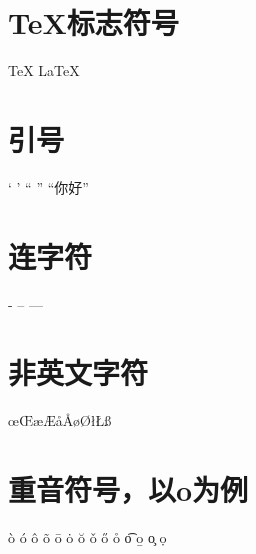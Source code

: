 \documentclass[12pt]{article}
\begin{document}
	\section{\TeX 标志符号}
	\TeX{} \quad \LaTeX{} \quad \LaTeXe{}
	
	\section{引号}
	` ' `` '' ``你好''

	\section{连字符}
	- \quad -- \quad ---
	
	\section{非英文字符}
	\oe \quad \OE \quad \ae \quad \AE \quad \aa \quad \AA \quad \o \quad \O \quad \l \quad \L \quad \ss \quad \SS 
	
	\section{重音符号，以o为例}
	\`o \quad \'o \quad \^o \quad \~o \quad \=o \quad \.o \quad \u{o} \quad \v{o} \quad \H{o} \quad \r{o} \quad \t{o} \quad \b{o} \quad \c{o} \quad \d{o} \quad
\end{document}
